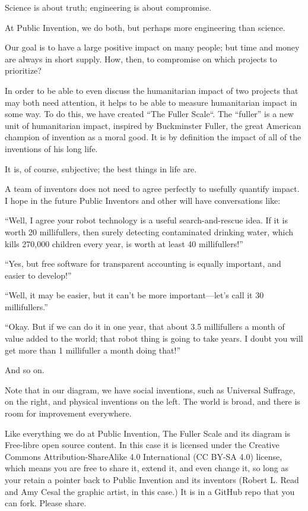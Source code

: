 \documentclass[
	fontsize=10pt, %
	twoside=false, %
	secnumdepth=1, %
]{kaobook}
\begin{document}
Science is about truth; engineering is about compromise.

At Public Invention, we do both, but perhaps more engineering than
science.

Our goal is to have a large positive impact on many people; but time
and money are always in short supply.  How, then, to compromise on
which projects to prioritize?

In order to be able to even discuss the humanitarian impact of two
projects that may both need attention, it helps to be able to measure
humanitarian impact in some way. To do this, we have created “The
Fuller Scale“. The “fuller” is a new unit of humanitarian impact,
inspired by Buckminster Fuller, the great American champion of
invention as a moral good. It is by definition the impact of all of
the inventions of his long life.

It is, of course, subjective; the best things in life are.

A team of inventors does not need to agree perfectly to usefully
quantify impact. I hope in the future Public Inventors and other will
have conversations like:

“Well, I agree your robot technology is a useful search-and-rescue
idea. If it is worth 20 millifullers, then surely detecting
contaminated drinking water, which kills 270,000 children every year,
is worth at least 40 millifullers!”

“Yes, but free software for transparent accounting is equally
important, and easier to develop!”

“Well, it may be easier, but it can’t be more important—let’s call it
30 millifullers.”

“Okay. But if we can do it in one year, that about 3.5 millifullers a
month of value added to the world; that robot thing is going to take
years. I doubt you will get more than 1 millifuller a month doing
that!”

And so on.

Note that in our diagram, we have social inventions, such as Universal
Suffrage, on the right, and physical inventions on the left. The world
is broad, and there is room for improvement everywhere.

Like everything we do at Public Invention, The Fuller Scale and its
diagram is Free-libre open source content.
In this case it is licensed
under the Creative Commons Attribution-ShareAlike 4.0 International
(CC BY-SA 4.0) license, which means you are free to share it, extend
it, and even change it, so long as your retain a pointer back to
Public Invention and its inventors (Robert L. Read and Amy Cesal the
graphic artist, in this case.) It is in a GitHub repo that you can
fork. Please share.
\end{document}
